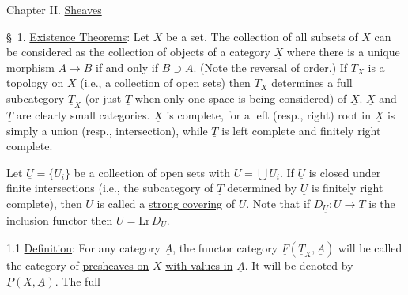 Chapter II. \uline{Sheaves}

\S\ 1. \uline{Existence Theorems}: Let $X$ be a set. The collection of all subsets of $X$ can be considered as the collection of objects of a category $\underline X$ where there is a unique morphism $A\longrightarrow B$ if and only if $B\supset A$. (Note the reversal of order.) If $T_X$ is a topology on $X$ (i.e., a collection of open sets) then $T_X$ determines a full subcategory $\underline T_X$ (or just $\underline T$ when only one space is being considered) of $\underline X$. $\underline X$ and $\underline T$ are clearly small categories. $\underline X$ is complete, for a left (resp., right) root in $\underline X$ is simply a union (resp., intersection), while $\underline T$ is left complete and finitely right complete.

Let $\underline U=\{U_i\}$ be a collection of open sets with $U=\bigcup U_i$. If $\underline U$ is closed under finite intersections (i.e., the subcategory of $\underline T$ determined by $\underline U$ is finitely right complete), then $\underline U$ is called a \uline{strong covering} of $U$. Note that if $D_{\underline U}:\underline U\longrightarrow\underline T$ is the inclusion functor then $U=\mathrm{Lr}\,D_{\underline U}$.

1.1 \uline{Definition}: For any category $\underline A$, the functor category $\underline F(\underline T_X,\underline A)$ will be called the category of \uline{presheaves on} $X$ \uline{with values in} $\underline A$. It will be denoted by $\underline P(X,\underline A)$. The full
